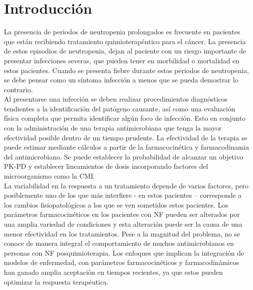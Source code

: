
\chapter{Introducción}
\small
La presencia de periodos de neutropenia prolongados es frecuente en pacientes que están recibiendo tratamiento quimioterapéutico para el cáncer. La presencia de estos episodios de neutropenia, dejan al paciente con un riesgo importante de presentar infecciones severas, que pueden tener en morbilidad o mortalidad en estos pacientes. Cuando se presenta fiebre durante estos periodos de neutropenia, se debe pensar como un síntoma infección a menos que se pueda demostrar lo contrario. \\

\noindent
Al presentarse una infección se deben realizar procedimientos diagnósticos tendientes a la identificación del patógeno causante, así como una evaluación física completa que permita identificar algún foco de infección. Esto en conjunto con la administración de una terapia antimicrobiana que tenga la mayor efectividad posible dentro de un tiempo prudente. La efectividad de la terapia se puede estimar mediante cálculos a partir de la farmacocinética y farmacodinamia del antimicrobiano. Se puede establecer la probabilidad de alcanzar un objetivo PK-PD y establecer lineamientos de dosis incorporando factores del microorganismo como la CMI. \\

\noindent
La variabilidad en la respuesta a un tratamiento depende de varios factores, pero posiblemente uno de los que más interfiere - en estos pacientes – corresponde a los cambios fisiopatológicos a los que se ven sometidos estos pacientes. Los parámetros farmacocinéticos en los pacientes con NF pueden ser alterados por una amplia variedad de condiciones y esta alteración puede ser la causa de una menor efectividad en los tratamientos. Pese a la magnitud del problema, no se conoce de manera integral el comportamiento de muchos antimicrobianos en personas con NF posquimioterapia. Los enfoques que implican la integración de modelos de enfermedad, con parámetros farmacocinéticos y farmacodinámicos han ganado amplia aceptación en tiempos recientes, ya que estos pueden optimizar la respuesta terapéutica. \\

